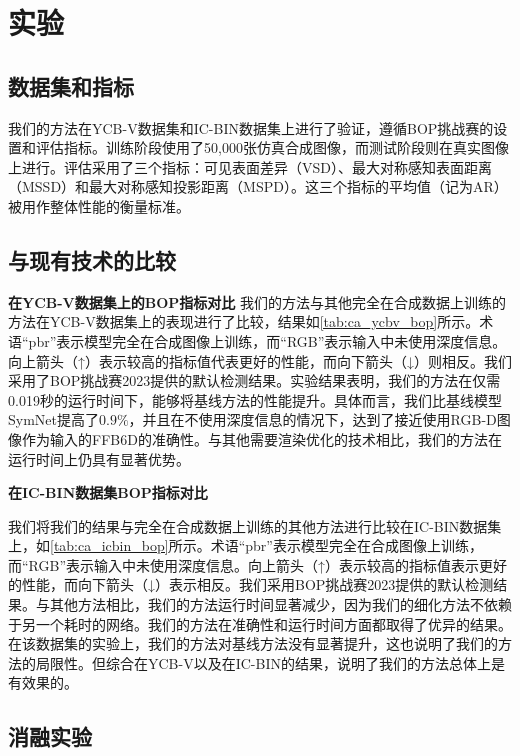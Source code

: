 \section{实验}

\subsection{数据集和指标}
我们的方法在YCB-V数据集\cite{ycbv}和IC-BIN数据集\cite{icbin}上进行了验证，遵循BOP挑战赛\cite{hodan2024bop}的设置和评估指标。训练阶段使用了50,000张仿真合成图像，而测试阶段则在真实图像上进行。评估采用了三个指标：可见表面差异（VSD）、最大对称感知表面距离（MSSD）和最大对称感知投影距离（MSPD）。这三个指标的平均值（记为AR）被用作整体性能的衡量标准。

\subsection{与现有技术的比较}

\textbf{在YCB-V数据集上的BOP指标对比 } 我们的方法与其他完全在合成数据上训练的方法在YCB-V数据集上的表现进行了比较，结果如\autoref{tab:ca_ycbv_bop}所示。术语“pbr”表示模型完全在合成图像上训练，而“RGB”表示输入中未使用深度信息。向上箭头（↑）表示较高的指标值代表更好的性能，而向下箭头（↓）则相反。我们采用了BOP挑战赛2023\cite{hodan2024bop}提供的默认检测结果。实验结果表明，我们的方法在仅需0.019秒的运行时间下，能够将基线方法的性能提升。具体而言，我们比基线模型SymNet\cite{symnet}提高了$0.9\%$，并且在不使用深度信息的情况下，达到了接近使用RGB-D图像作为输入的FFB6D\cite{he2021ffb6d}的准确性。与其他需要渲染优化的技术相比，我们的方法在运行时间上仍具有显著优势。



\textbf{在IC-BIN数据集BOP指标对比}

我们将我们的结果与完全在合成数据上训练的其他方法进行比较在IC-BIN数据集上，如\autoref{tab:ca_icbin_bop}所示。术语“pbr”表示模型完全在合成图像上训练，而“RGB”表示输入中未使用深度信息。向上箭头（↑）表示较高的指标值表示更好的性能，而向下箭头（↓）表示相反。我们采用BOP挑战赛2023\cite{hodan2024bop}提供的默认检测结果。与其他方法相比，我们的方法运行时间显著减少，因为我们的细化方法不依赖于另一个耗时的网络。我们的方法在准确性和运行时间方面都取得了优异的结果。在该数据集的实验上，我们的方法对基线方法没有显著提升，这也说明了我们的方法的局限性。但综合在YCB-V以及在IC-BIN的结果，说明了我们的方法总体上是有效果的。



\subsection{消融实验}


